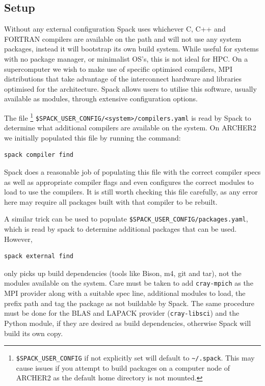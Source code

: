 \documentclass[a4paper,11pt]{article}
\begin{document}
\subsection{Setup}
\label{ssec:setup}
Without any external configuration Spack uses whichever C, C++ and FORTRAN compilers are available on the path and will not use any system packages, instead it will bootstrap its own build system.
While useful for systems with no package manager, or minimalist OS's, this is not ideal for HPC.
On a supercomputer we wish to make use of specific optimised compilers, MPI distributions that take advantage of the interconnect hardware and libraries optimised for the architecture.
Spack allows users to utilise this software, usually available as modules, through extensive configuration options.

The file
\footnote{\texttt{\$SPACK\_USER\_CONFIG} if not explicitly set will default to \texttt{\~{}/.spack}. This may cause issues if you attempt to build packages on a computer node of ARCHER2 as the default home directory is not mounted.}
\verb`$SPACK_USER_CONFIG/<system>/compilers.yaml` is read by Spack to determine what additional compilers are available on the system.
On ARCHER2 we initially populated this file by running the command:
\begin{lstlisting}[numbers=none]
spack compiler find	
\end{lstlisting}
Spack does a reasonable job of populating this file with the correct compiler specs as well as appropriate compiler flags and even configures the correct modules to load to use the compilers.
It is still worth checking this file carefully, as any error here may require all packages built with that compiler to be rebuilt.

A similar trick can be used to populate \verb`$SPACK_USER_CONFIG/packages.yaml`, which is read by spack to determine additional packages that can be used.
However,
\begin{lstlisting}[numbers=none]
spack external find	
\end{lstlisting}
only picks up build dependencies (tools like Bison, m4, git and tar), not the modules available on the system.
Care must be taken to add \verb`cray-mpich` as the MPI provider along with a suitable spec line, additional modules to load, the prefix path and tag the package as not buildable by Spack.
The same procedure must be done for the BLAS and LAPACK provider (\verb`cray-libsci`) and the Python module, if they are desired as build dependencies, otherwise Spack will build its own copy.
\end{document}
